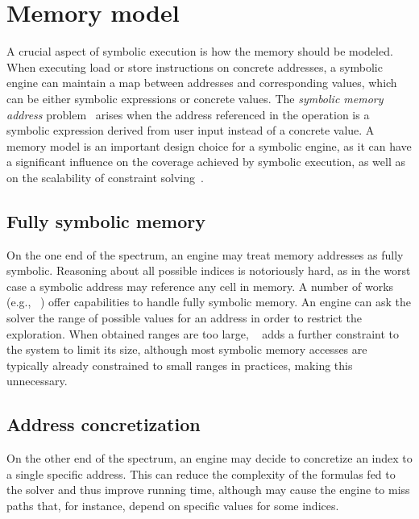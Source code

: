 
\section{Memory model}
\label{memory-model}

A crucial aspect of symbolic execution is how the memory should be modeled. When executing load or store instructions on concrete addresses, a symbolic engine can maintain a map between addresses and corresponding values, which can be either symbolic expressions or concrete values. The {\em symbolic memory address} problem~\cite{SAB-SP10} arises when the address referenced in the operation is a symbolic expression derived from user input instead of a concrete value. A memory model is an important design choice for a symbolic engine, as it can have a significant influence on the coverage achieved by symbolic execution, as well as on the scalability of constraint solving~\cite{CS-CACM13}.

\subsection{Fully symbolic memory}
On the one end of the spectrum, an engine may treat memory addresses as fully symbolic. Reasoning about all possible indices is notoriously hard, as in the worst case a symbolic address may reference any cell in memory. A number of works (e.g., ~\cite{BITBLAZE-ICISS08,TLL-CAV10,BAP-CAV11,TS-ATVA14}) offer capabilities to handle fully symbolic memory. An engine can ask the solver the range of possible values for an address in order to restrict the exploration.  When obtained ranges are too large, ~\cite{BITBLAZE-ICISS08} adds a further constraint to the system to limit its size, although most symbolic memory accesses are typically already constrained to small ranges in practices, making this unnecessary.

\subsection{Address concretization}
On the other end of the spectrum, an engine may decide to concretize an index to a single specific address. This can reduce the complexity of the formulas fed to the solver and thus improve running time, although may cause the engine to miss paths that, for instance, depend on specific values for some indices. 

